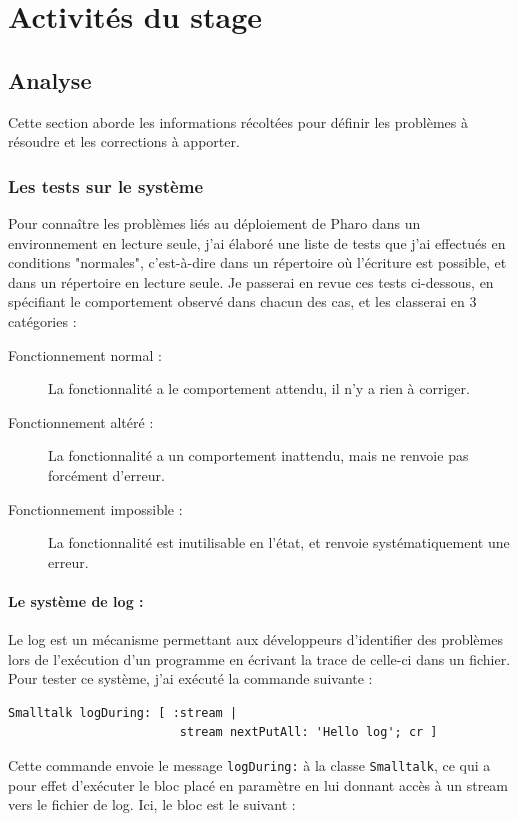\section{Activités du stage}
\subsection{Analyse}
Cette section aborde les informations récoltées pour définir les problèmes à résoudre et les corrections à apporter.
\subsubsection{Les tests sur le système}
Pour connaître les problèmes liés au déploiement de Pharo dans un environnement en lecture seule, j'ai élaboré une liste de tests que j'ai effectués en conditions "normales", c'est-à-dire dans un répertoire où l'écriture est possible, et dans un répertoire en lecture seule. Je passerai en revue ces tests ci-dessous, en spécifiant le comportement observé dans chacun des cas, et les classerai en 3 catégories :
\begin{description}
	\item[Fonctionnement normal :] La fonctionnalité a le comportement attendu, il n'y a rien à corriger.
	\item[Fonctionnement altéré :] La fonctionnalité a un comportement inattendu, mais ne renvoie pas forcément d'erreur.
	\item[Fonctionnement impossible :] La fonctionnalité est inutilisable en l'état, et renvoie systématiquement une erreur.
\end{description}

\paragraph{Le système de log :}
Le log est un mécanisme permettant aux développeurs d'identifier des problèmes lors de l'exécution d'un programme en écrivant la trace de celle-ci dans un fichier. Pour tester ce système, j'ai exécuté la commande suivante :
\begin{verbatim}
Smalltalk logDuring: [ :stream |
                        stream nextPutAll: 'Hello log'; cr ]
\end{verbatim}
Cette commande envoie le message \verb$logDuring:$ à la classe \verb$Smalltalk$, ce qui a pour effet d'exécuter le bloc placé en paramètre en lui donnant accès à un stream vers le fichier de log. Ici, le bloc est le suivant :

